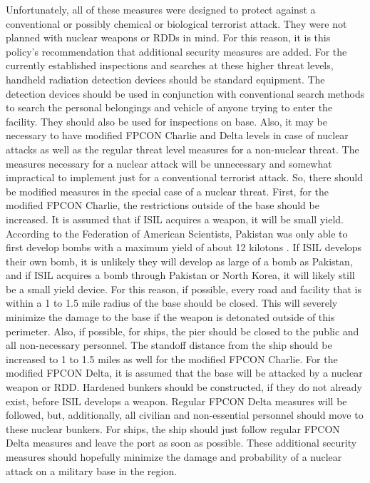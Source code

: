 \documentclass{report}
\begin{document}
Unfortunately, all of these measures were designed to protect against a conventional or possibly chemical or biological terrorist attack.  They were not planned with nuclear weapons or RDDs in mind.  For this reason, it is this policy's recommendation that additional security measures are added.  For the currently established inspections and searches at these higher threat levels, handheld radiation detection devices should be standard equipment.  The detection devices should be used in conjunction with conventional search methods to search the personal belongings and vehicle of anyone trying to enter the facility. They should also be used for inspections on base.  Also, it may be necessary to have modified FPCON Charlie and Delta levels in case of nuclear attacks as well as the regular threat level measures for a non-nuclear threat.  The measures necessary for a nuclear attack will be unnecessary and somewhat impractical to implement just for a conventional terrorist attack.  So, there should be modified measures in the special case of a nuclear threat.  First, for the modified FPCON Charlie, the restrictions outside of the base should be increased.  It is assumed that if ISIL acquires a weapon, it will be small yield.  According to the Federation of American Scientists, Pakistan was only able to first develop bombs with a maximum yield of about 12 kilotons \cite{FederationofAmericanScientists2002}.  If ISIL develops their own bomb, it is unlikely they will develop as large of a bomb as Pakistan, and if ISIL acquires a bomb through Pakistan or North Korea, it will likely still be a small yield device.  For this reason, if possible, every road and facility that is within a 1 to 1.5 mile radius of the base should be closed.  This will severely minimize the damage to the base if the weapon is detonated outside of this perimeter.  Also, if possible, for ships, the pier should be closed to the public and all non-necessary personnel.  The standoff distance from the ship should be increased to 1 to 1.5 miles as well for the modified FPCON Charlie.  For the modified FPCON Delta, it is assumed that the base will be attacked by a nuclear weapon or RDD.  Hardened bunkers should be constructed, if they do not already exist, before ISIL develops a weapon.  Regular FPCON Delta measures will be followed, but, additionally, all civilian and non-essential personnel should move to these nuclear bunkers.  For ships, the ship should just follow regular FPCON Delta measures and leave the port as soon as possible.  These additional security measures should hopefully minimize the damage and probability of a nuclear attack on a military base in the region.
\end{document}

